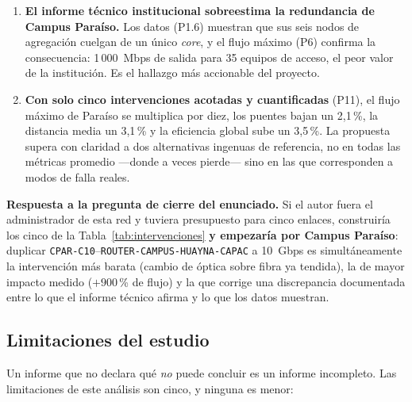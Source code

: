 \documentclass[10pt,a4paper]{extarticle}
\newcommand{\code}[1]{\texttt{\small #1}}
\begin{document}
\begin{enumerate}[leftmargin=*,itemsep=2mm]
\item \textbf{El informe técnico institucional sobreestima la redundancia de Campus
Paraíso.} Los datos (P1.6) muestran que sus seis nodos de agregación cuelgan de un único
\textit{core}, y el flujo máximo (P6) confirma la consecuencia: 1\,000~Mbps de salida para 35
equipos de acceso, el peor valor de la institución. Es el hallazgo más accionable del
proyecto.

\item \textbf{Con solo cinco intervenciones acotadas y cuantificadas} (P11), el flujo máximo
de Paraíso se multiplica por diez, los puentes bajan un 2,1\,\%, la distancia media un 3,1\,\%
y la eficiencia global sube un 3,5\,\%. La propuesta supera con claridad a dos alternativas
ingenuas de referencia, no en todas las métricas promedio ---donde a veces pierde--- sino en
las que corresponden a modos de falla reales.
\end{enumerate}

\begin{clave}
\textbf{Respuesta a la pregunta de cierre del enunciado.} Si el autor fuera el administrador
de esta red y tuviera presupuesto para cinco enlaces, construiría los cinco de la
Tabla~\ref{tab:intervenciones} \textbf{y empezaría por Campus Paraíso}: duplicar
\code{CPAR-C10}--\code{ROUTER-CAMPUS-HUAYNA-CAPAC} a 10~Gbps es simultáneamente la
intervención más barata (cambio de óptica sobre fibra ya tendida), la de mayor impacto
medido ($+900$\,\% de flujo) y la que corrige una discrepancia documentada entre lo que el
informe técnico afirma y lo que los datos muestran.
\end{clave}

\subsection{Limitaciones del estudio}

Un informe que no declara qué \textit{no} puede concluir es un informe incompleto. Las
limitaciones de este análisis son cinco, y ninguna es menor:
\end{document}
